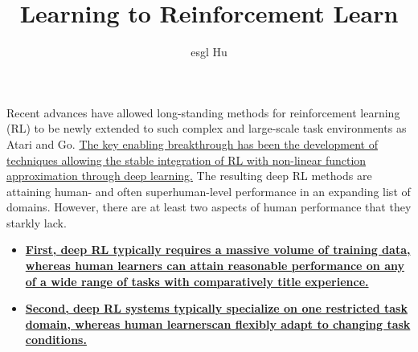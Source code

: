 \documentclass[12pt,a4paper]{article}
\begin{document}
\title{Learning to Reinforcement Learn\cite{Wang2016Learning}}
\author{esgl Hu}
\maketitle
\paragraph{} Recent advances have allowed long-standing methods for reinforcement learning (RL) to be newly extended to such complex and large-scale task environments as Atari and Go. \uline{The key enabling breakthrough has been the development of techniques allowing the stable integration of RL with non-linear function approximation through deep learning.} The resulting deep RL methods are attaining human- and often superhuman-level performance in an expanding list of domains. However, there are at least two aspects of human performance that they starkly lack. 
\begin{itemize}
	\item \textbf{\uline{First, deep RL typically requires a massive volume of training data, whereas human learners can attain reasonable performance on any of a wide range of tasks with comparatively title experience.}}
	\item \textbf{\uline{Second, deep RL systems typically specialize on one restricted task domain, whereas human learnerscan flexibly adapt to changing task conditions.}}
\end{itemize}


\end{document}
